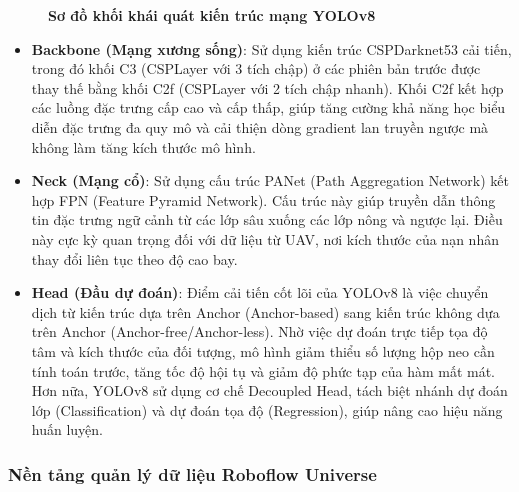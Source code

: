 \begin{figure}[H]
{
    }
    \caption[Sơ đồ khối khái quát kiến trúc mạng nơ-ron tích chập YOLOv8]{\bfseries\fontsize{12pt}{0pt}\selectfont Sơ đồ khối khái quát kiến trúc mạng YOLOv8}
    \label{fig:yolov8_architecture}
\end{figure}

\begin{itemize}
    \item \textbf{Backbone (Mạng xương sống)}: Sử dụng kiến trúc CSPDarknet53 cải tiến, trong đó khối C3 (CSPLayer với 3 tích chập) ở các phiên bản trước được thay thế bằng khối C2f (CSPLayer với 2 tích chập nhanh). Khối C2f kết hợp các luồng đặc trưng cấp cao và cấp thấp, giúp tăng cường khả năng học biểu diễn đặc trưng đa quy mô và cải thiện dòng gradient lan truyền ngược mà không làm tăng kích thước mô hình.
    \item \textbf{Neck (Mạng cổ)}: Sử dụng cấu trúc PANet (Path Aggregation Network) kết hợp FPN (Feature Pyramid Network). Cấu trúc này giúp truyền dẫn thông tin đặc trưng ngữ cảnh từ các lớp sâu xuống các lớp nông và ngược lại. Điều này cực kỳ quan trọng đối với dữ liệu từ UAV, nơi kích thước của nạn nhân thay đổi liên tục theo độ cao bay.
    \item \textbf{Head (Đầu dự đoán)}: Điểm cải tiến cốt lõi của YOLOv8 là việc chuyển dịch từ kiến trúc dựa trên Anchor (Anchor-based) sang kiến trúc không dựa trên Anchor (Anchor-free/Anchor-less). Nhờ việc dự đoán trực tiếp tọa độ tâm và kích thước của đối tượng, mô hình giảm thiểu số lượng hộp neo cần tính toán trước, tăng tốc độ hội tụ và giảm độ phức tạp của hàm mất mát. Hơn nữa, YOLOv8 sử dụng cơ chế Decoupled Head, tách biệt nhánh dự đoán lớp (Classification) và dự đoán tọa độ (Regression), giúp nâng cao hiệu năng huấn luyện.
\end{itemize}

\subsubsection{Nền tảng quản lý dữ liệu Roboflow Universe}

